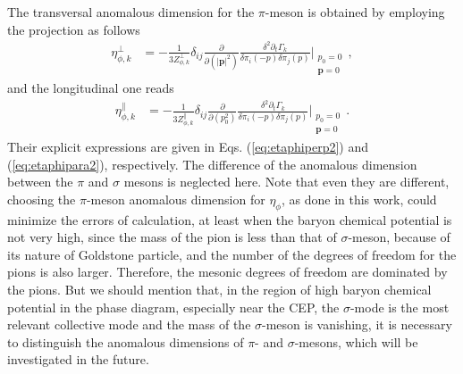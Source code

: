 \documentclass[%
reprint,
superscriptaddress,
showpacs,preprintnumbers,
 amsmath,amssymb,
 aps,
prd,
]{revtex4-1}
\begin{document}
The transversal anomalous dimension for the  $\pi$-meson is obtained by employing the projection as follows
\begin{align}
  \eta_{\phi,k}^{\perp}&=-\frac{1}{3Z_{\phi,k}^{\perp}}\delta_{ij}\frac{\partial}{\partial (|\bm{p}|^2)}\frac{\delta^2 \partial_t \Gamma_k}{\delta \pi_i(-p) \delta \pi_j(p)}\Bigg|_{\substack{p_0=0\\ \bm{p}=0}}\,,\label{eq:etaphiperp}
\end{align}
and the longitudinal one reads
\begin{align}
  \eta_{\phi,k}^{\parallel}&=-\frac{1}{3Z_{\phi,k}^{\parallel}}\delta_{ij}\frac{\partial}{\partial (p_0^2)}\frac{\delta^2 \partial_t \Gamma_k}{\delta \pi_i(-p) \delta \pi_j(p)}\Bigg|_{\substack{p_0=0\\ \bm{p}=0}}\,.\label{eq:etaphipara}
\end{align}
Their explicit expressions are given in Eqs. (\ref{eq:etaphiperp2}) and (\ref{eq:etaphipara2}), respectively. The difference of the anomalous dimension between the $\pi$ and $\sigma$ mesons is neglected here. Note that even they are different, choosing the $\pi$-meson anomalous dimension for $\eta_\phi$, as done in this work, could minimize the errors of calculation, at least when the baryon chemical potential is not very high, since the mass of the pion is less than that of $\sigma$-meson, because of its nature of Goldstone particle, and the number of the degrees of freedom for the pions is also larger. Therefore, the mesonic degrees of freedom are dominated by the pions. But we should mention that, in the region of  high baryon chemical potential in the phase diagram, especially near the CEP, the $\sigma$-mode is the most relevant collective mode and the mass of the $\sigma$-meson is vanishing, it is necessary to distinguish the anomalous dimensions of $\pi$- and $\sigma$-mesons, which will be investigated in the future.
\end{document}
